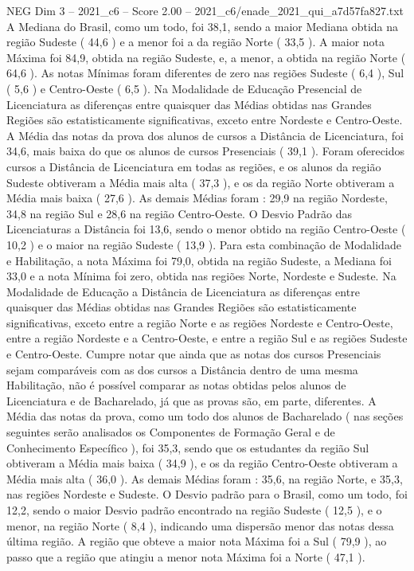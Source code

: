 \begin{textsample}{NEG Dim 3 – 2021\_c6 – Score 2.00 – 2021\_c6/enade\_2021\_qui\_a7d57fa827.txt}
A Mediana do Brasil, como um todo, foi 38,1, sendo a maior Mediana obtida na região Sudeste ( 44,6 ) e a menor foi a da região Norte ( 33,5 ).
A maior nota Máxima foi 84,9, obtida na região Sudeste, e, a menor, a obtida na região Norte ( 64,6 ).
As notas Mínimas foram diferentes de zero nas regiões Sudeste ( 6,4 ), Sul ( 5,6 ) e Centro-Oeste ( 6,5 ).
Na Modalidade de Educação Presencial de Licenciatura as diferenças entre quaisquer das Médias obtidas nas Grandes Regiões são estatisticamente significativas, exceto entre Nordeste e Centro-Oeste.
A Média das notas da prova dos alunos de cursos a Distância de Licenciatura, foi 34,6, mais baixa do que os alunos de cursos Presenciais ( 39,1 ).
Foram oferecidos cursos a Distância de Licenciatura em todas as regiões, e os alunos da região Sudeste obtiveram a Média mais alta ( 37,3 ), e os da região Norte obtiveram a Média mais baixa ( 27,6 ).
As demais Médias foram : 29,9 na região Nordeste, 34,8 na região Sul e 28,6 na região Centro-Oeste.
O Desvio Padrão das Licenciaturas a Distância foi 13,6, sendo o menor obtido na região Centro-Oeste ( 10,2 ) e o maior na região Sudeste ( 13,9 ).
Para esta combinação de Modalidade e Habilitação, a nota Máxima foi 79,0, obtida na região Sudeste, a Mediana foi 33,0 e a nota Mínima foi zero, obtida nas regiões Norte, Nordeste e Sudeste.
Na Modalidade de Educação a Distância de Licenciatura as diferenças entre quaisquer das Médias obtidas nas Grandes Regiões são estatisticamente significativas, exceto entre a região Norte e as regiões Nordeste e Centro-Oeste, entre a região Nordeste e a Centro-Oeste, e entre a região Sul e as regiões Sudeste e Centro-Oeste.
Cumpre notar que ainda que as notas dos cursos Presenciais sejam comparáveis com as dos cursos a Distância dentro de uma mesma Habilitação, não é possível comparar as notas obtidas pelos alunos de Licenciatura e de Bacharelado, já que as provas são, em parte, diferentes.
A Média das notas da prova, como um todo dos alunos de Bacharelado ( nas seções seguintes serão analisados os Componentes de Formação Geral e de Conhecimento Específico ), foi 35,3, sendo que os estudantes da região Sul obtiveram a Média mais baixa ( 34,9 ), e os da região Centro-Oeste obtiveram a Média mais alta ( 36,0 ).
As demais Médias foram : 35,6, na região Norte, e 35,3, nas regiões Nordeste e Sudeste.
O Desvio padrão para o Brasil, como um todo, foi 12,2, sendo o maior Desvio padrão encontrado na região Sudeste ( 12,5 ), e o menor, na região Norte ( 8,4 ), indicando uma dispersão menor das notas dessa última região.
A região que obteve a maior nota Máxima foi a Sul ( 79,9 ), ao passo que a região que atingiu a menor nota Máxima foi a Norte ( 47,1 ).

\end{textsample}
